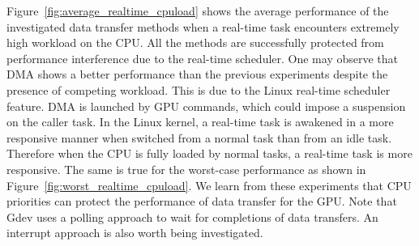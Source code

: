 Figure~\ref{fig:average_realtime_cpuload} shows the average performance
of the investigated data transfer methods when a real-time task
encounters extremely high workload on the CPU.
All the methods are successfully protected from performance interference
due to the real-time scheduler.
One may observe that \textsf{DMA} shows a better performance than the
previous experiments despite the presence of competing workload.
This is due to the Linux real-time scheduler feature.
\textsf{DMA} is launched by GPU commands, which could impose a
suspension on the caller task.
In the Linux kernel, a real-time task is awakened in a more responsive
manner when switched from a normal task than from an idle task.
Therefore when the CPU is fully loaded by normal tasks, a real-time task
is more responsive.
The same is true for the worst-case performance as shown in
Figure~\ref{fig:worst_realtime_cpuload}.
We learn from these experiments that CPU priorities can protect the
performance of data transfer for the GPU.
Note that Gdev uses a polling approach to wait for completions of data
transfers.
An interrupt approach is also worth being investigated.

